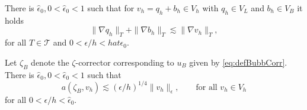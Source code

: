 \documentclass[10pt,a4paper]{amsart}
\newcommand{\T}{\ensuremath{\mathcal{T}}\xspace}
\begin{document}
\begin{propo}
\label{Propo:AngleSpace2}
There is $\hat{\epsilon}_0, 0 < \hat{\epsilon}_0 < 1$ such that for
${v_h = q_h + b_h}\in V_h$ with $q_h \in V_L$  and $b_h \in V_B$ it holds
\begin{equation*}
    \|\nabla q_h\|_T  + \|\nabla b_h\|_T \lesssim \|\nabla v_h\|_T ,
\end{equation*}
for all $T\in \T$ and $0<\epsilon / h <hat{\epsilon}_0$.
\end{propo}

\begin{lemma}\label{Lemma:12}
Let $\zeta_B$ denote the $\zeta$-corrector corresponding to $u_B$ given by \eqref{eq:defBubbCorr}. There is $\hat{\epsilon}_0, 0 < \hat{\epsilon}_0 < 1$
such that
$$
 a(\zeta_B,v_h) \lesssim (\epsilon/h)^{1/4} \|v_h\|_\epsilon, \qquad \text{for all $v_h \in V_h$}
$$
for all $0<\epsilon/h <\hat{\epsilon}_0$.
\end{lemma}
\end{document}
